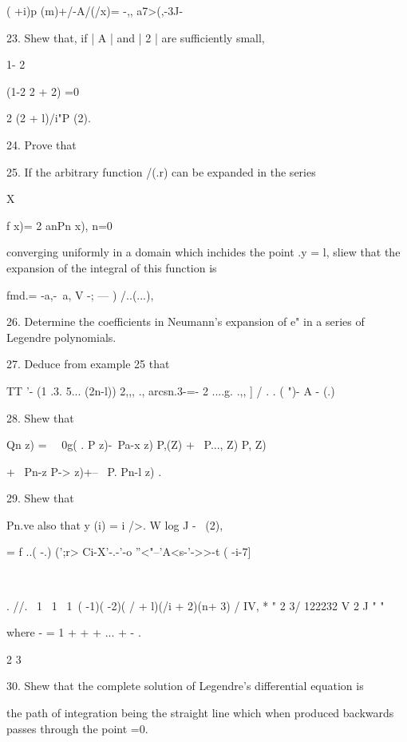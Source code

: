 {{{{( +i)p (m)+/-A/(/x)= -,, a7>(,-3J-

23. Shew that, if | A | and | 2 | are sufficiently small,

1- 2

(1-2 2 + 2) =0

2 (2 + l)/i"P (2).

%
%

24. Prove that


25. If the arbitrary function /(.r) can be expanded in the series

X

f x)= 2 anPn x), n=0

converging uniformly in a domain which inchides the point .y = l,
sliew that the expansion of the integral of this function is

fmd.= -a,-\ a, V -; --- ) /..(...), 

26. Determine the coefficients in Neumann's expansion of e" in a
series of Legendre polynomials. 

27. Deduce from example 25 that

TT '- (1 .3. 5... (2n-l)) 2,,, ., arcsn.3-=- 2 ....g. .,, ] / . . (
")- A - (.)


28. Shew that

Qn z) = \ \ 0g( . P z)-\ Pa-x z) P,(Z) + \ P..., Z) P, Z)

+ \ Pn-z P-> z)+-- \ P. Pn-l z) .


29. Shew that

Pn.ve also that y (i) = i />. W log J - \, (2),

= f ..( -.) (';r> Ci-X'-.-'-o ''<"--'A<s-'->>-t ( -i-7]

\

. //. \ 1 \ 1 \ 1\ ( -1)( -2)( / + l)(/i + 2)(n+ 3) / IV, * " 2 3/
122232 V 2 J "  "

where - = 1 + + + ... + - . 

2 3

30. Shew that the complete solution of Legendre's differential
equation is

the path of integration being the straight line which when produced
backwards passes through the point =0.

}}}}
